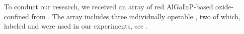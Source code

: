 	To conduct our research, we received an array of red AlGaInP-based oxide-confined \VCSELs from \michler. The array includes three individually operable \VCSELs, two of which, labeled \BmFour and \BmTwo were used in our experiments, see .

	\begin{figure}[htp]
		\begin{subfigure}[t]{ 0.49\linewidth}
			\centering
			\caption{}
			\label{subfig::vcsel_sem_big_overview}
		\end{subfigure}
		\hfill
		\begin{subfigure}[t]{ 0.49\linewidth}
			\centering
			\caption{}
			\label{subfig::vcsel_sem_detail}
		\end{subfigure}

\end{figure}
